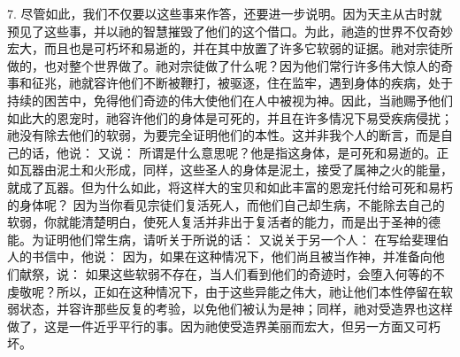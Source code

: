 7. 尽管如此，我们不仅要以这些事来作答，还要进一步说明。因为天主从古时就预见了这些事，并以祂的智慧摧毁了他们的这个借口。为此，祂造的世界不仅奇妙宏大，而且也是可朽坏和易逝的，并在其中放置了许多它软弱的证据。祂对宗徒所做的，也对整个世界做了。祂对宗徒做了什么呢？因为他们常行许多伟大惊人的奇事和征兆，祂就容许他们不断被鞭打，被驱逐，住在监牢，遇到身体的疾病，处于持续的困苦中，免得他们奇迹的伟大使他们在人中被视为神。因此，当祂赐予他们如此大的恩宠时，祂容许他们的身体是可死的，并且在许多情况下易受疾病侵扰；祂没有除去他们的软弱，为要完全证明他们的本性。这并非我个人的断言，而是自己的话，他说：  又说：  所谓是什么意思呢？他是指这身体，是可死和易逝的。正如瓦器由泥土和火形成，同样，这些圣人的身体是泥土，接受了属神之火的能量，就成了瓦器。但为什么如此，将这样大的宝贝和如此丰富的恩宠托付给可死和易朽的身体呢？ 因为当你看见宗徒们复活死人，而他们自己却生病，不能除去自己的软弱，你就能清楚明白，使死人复活并非出于复活者的能力，而是出于圣神的德能。为证明他们常生病，请听关于所说的话： 又说关于另一个人：  在写给斐理伯人的书信中，他说：  因为，如果在这种情况下，他们尚且被当作神，并准备向他们献祭，说：  如果这些软弱不存在，当人们看到他们的奇迹时，会堕入何等的不虔敬呢？所以，正如在这种情况下，由于这些异能之伟大，祂让他们本性停留在软弱状态，并容许那些反复的考验，以免他们被认为是神；同样，祂对受造界也这样做了，这是一件近乎平行的事。因为祂使受造界美丽而宏大，但另一方面又可朽坏。\par

